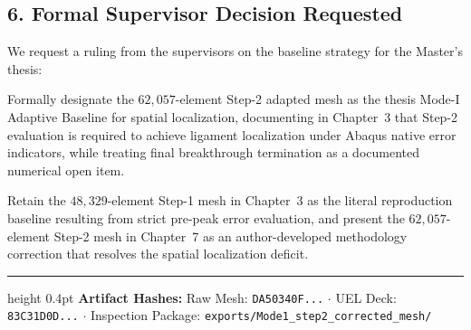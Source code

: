 \documentclass[10pt,a4paper]{article}
\begin{document}
\vspace{-0.25em}
\subsection*{6. Formal Supervisor Decision Requested}
\vspace{-0.25em}
We request a ruling from the supervisors on the baseline strategy for the Master's thesis:

\begin{tcolorbox}[colback=green!5!white,colframe=green!60!black,title=\textbf{Option A: Adopt Step-2 Mesh as Baseline for Spatial Localization (Recommended)},top=2pt,bottom=2pt,left=4pt,right=4pt]
\small
Formally designate the $62{,}057$-element Step-2 adapted mesh as the thesis Mode-I Adaptive Baseline for spatial localization, documenting in Chapter~3 that Step-2 evaluation is required to achieve ligament localization under Abaqus native error indicators, while treating final breakthrough termination as a documented numerical open item.
\end{tcolorbox}

\vspace{-0.15em}
\begin{tcolorbox}[colback=gray!5!white,colframe=gray!60!black,title=\textbf{Option B: Retain Step-1 as Literal Reproduction Baseline; Present Step-2 as Project Improvement},top=2pt,bottom=2pt,left=4pt,right=4pt]
\small
Retain the $48{,}329$-element Step-1 mesh in Chapter~3 as the literal reproduction baseline resulting from strict pre-peak error evaluation, and present the $62{,}057$-element Step-2 mesh in Chapter~7 as an author-developed methodology correction that resolves the spatial localization deficit.
\end{tcolorbox}

\vfill
\hrule height 0.4pt
\vspace{0.12em}
{\scriptsize\textbf{Artifact Hashes:} Raw Mesh: \texttt{DA50340F...} $\cdot$ UEL Deck: \texttt{83C31D0D...} $\cdot$ Inspection Package: \texttt{exports/Mode1\_step2\_corrected\_mesh/}}
\end{document}
